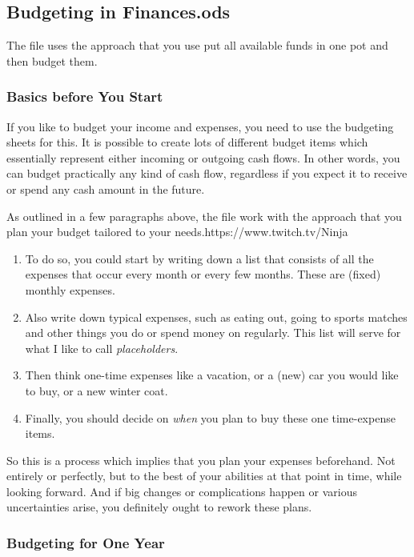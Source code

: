 \subsection{Budgeting in Finances.ods}
\label{subsec:budgeting-in-finances.ods}

The file uses the approach that you use put all available funds in one pot and then budget them.

\subsubsection{Basics before You Start}
\label{subsubsec:budgeting-basics}

If you like to budget your income and expenses, you need to use the budgeting sheets for this.
It is possible to create lots of different budget items which essentially represent either incoming or outgoing cash flows.
In other words, you can budget practically any kind of cash flow, regardless if you expect it to receive or spend any cash amount in the future.

As outlined in a few paragraphs above, the file work with the approach that you plan your budget tailored to your needs.https://www.twitch.tv/Ninja
\begin{enumerate}	
	\item To do so, you could start by writing down a list that consists of all the expenses that occur every month or every few months.
	These are (fixed) monthly expenses.
	\item Also write down typical expenses, such as eating out, going to sports matches and other things you do or spend money on regularly.
	This list will serve for what I like to call \emph{placeholders}.
	\item Then think one-time expenses like a vacation, or a (new) car you would like to buy, or a new winter coat.
	\item Finally, you should decide on \emph{when} you plan to buy these one time-expense items.
\end{enumerate}

So this is a process which implies that you plan your expenses beforehand.
Not entirely or perfectly, but to the best of your abilities at that point in time, while looking forward.
And if big changes or complications happen or various uncertainties arise, you definitely ought to rework these plans.

\subsubsection{Budgeting for One Year}
\label{subsubsec:budgeting-for-one-year}


